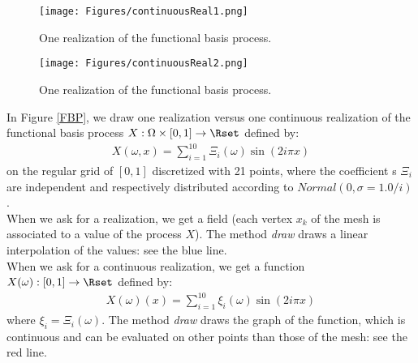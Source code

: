              \begin{figure}[H]
               \begin{minipage}{9cm}
                 \begin{center}
                   \texttt{[image: Figures/continuousReal1.png]}
                   \caption{One realization of the functional basis process.}
                   \label{continuousReal1}
                 \end{center}
               \end{minipage}
               \hfill
               \begin{minipage}{9cm}
                 \begin{center}
                   \texttt{[image: Figures/continuousReal2.png]}
                   \caption{One realization of the functional basis process.}
                   \label{continuousReal2}
                 \end{center}
               \end{minipage}
             \end{figure}

             In Figure \ref{FBP}, we draw one realization versus one continuous realization of the functional basis process $X: \Omega \times [0,1] \rightarrow \Rset$ defined by:
             \begin{align}
               X(\omega, x)=\sum_{i=1}^{10} \Xi_{i}(\omega)\sin(2i\pi x)
             \end{align}
             on the regular grid  of $[0,1]$ discretized with 21 points, where the coefficient s $\Xi_i$ are independent and respectively distributed according to $Normal(0,\sigma=1.0/i)$.\\
             When we ask for a realization, we get a field (each vertex $x_k$ of the mesh is associated to a value of the process $X$). The method \textit{draw} draws a linear interpolation of the values: see the blue line.\\
             When we ask for a continuous realization, we get a function $X(\omega): [0,1] \rightarrow \Rset$ defined by:
             \begin{align}
               X(\omega)(x)=\sum_{i=1}^{10} \xi_{i}(\omega)\sin(2i\pi x)
             \end{align}
             where $ \xi_{i}= \Xi_{i}(\omega)$.  The method \textit{draw} draws the graph of the function, which is continuous and can be evaluated on other points than those of the mesh: see the red line.


